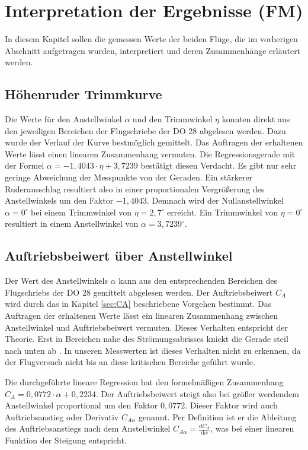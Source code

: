 \chapter{Interpretation der Ergebnisse (FM)}

In diesem Kapitel sollen die gemessen Werte der beiden Flüge, die im vorherigen Abschnitt aufgetragen wurden, interpretiert und deren Zusammenhänge erläutert werden. 

\section{Höhenruder Trimmkurve}
Die Werte für den Anstellwinkel $\alpha$ und den Trimmwinkel $\eta$ konnten direkt aus den jeweiligen Bereichen der Flugschriebe der DO 28 abgelesen werden. Dazu wurde der Verlauf der Kurve bestmöglich gemittelt. Das Auftragen der erhaltenen Werte lässt einen linearen Zusammenhang vermuten. Die Regressionsgerade mit der Formel $\alpha = -1,4043 \cdot \eta + 3,7239$ bestätigt diesen Verdacht. Es gibt nur sehr geringe Abweichung der Messpunkte von der Geraden. Ein stärkerer Ruderausschlag resultiert also in einer proportionalen Vergrößerung des Anstellwinkels um den Faktor $- 1,4043$.
Demnach wird der Nullanstellwinkel $\alpha = 0^{\circ}$ bei einem Trimmwinkel von $\eta = 2,7^{\circ}$ erreicht. Ein Trimmwinkel von $\eta = 0^{\circ}$ resultiert in einem Anstellwinkel von $\alpha = 3,7239^{\circ}$.

\section{Auftriebsbeiwert über Anstellwinkel}
Der Wert des Anstellwinkels $\alpha$ kann aus den entsprechenden Bereichen des Flugschriebs der DO 28 gemittelt abgelesen werden. Der Auftriebsbeiwert $C_A$ wird durch das in Kapitel \ref{sec:CA} beschriebene Vorgehen bestimmt. 
Das Auftragen der erhaltenen Werte lässt ein linearen Zusammenhang zwischen Anstellwinkel und Auftriebsbeiwert vermuten. Dieses Verhalten entspricht der Theorie. Erst in Bereichen nahe des Strömungsabrisses knickt die Gerade steil nach unten ab \citep{Skript}. In unseren Messwerten ist dieses Verhalten nicht zu erkennen, da der Flugversuch nicht bis an diese kritischen Bereiche geführt wurde.

Die durchgeführte lineare Regression hat den formelmäßigen Zusammenhang $C_A = 0,0772 \cdot \alpha + 0,2234$. Der Auftriebsbeiwert steigt also bei größer werdendem Anstellwinkel proportional um den Faktor $0,0772$. Dieser Faktor wird auch Auftriebsanstieg oder Derivativ $C_{A \alpha}$ genannt. Per Definition ist er die Ableitung des Auftriebsanstiegs nach dem Anstellwinkel $C_{A \alpha} = \frac{\mathrm{d} C_A}{\mathrm{d} \alpha}$, was bei einer linearen Funktion der Steigung entspricht. \citep{Skript}

